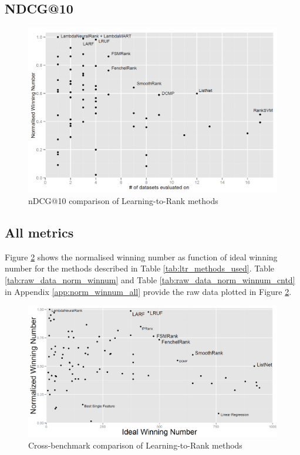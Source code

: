 \subsection{NDCG@10}
\begin{figure}[!h]
\includegraphics[scale=0.35]{gfx/ndcg10_winnum}
\caption{\acs{nDCG}@10 comparison of Learning-to-Rank methods}
\label{fig:normalised_winning_number_ndcg10}
\end{figure}


\subsection{All metrics}
Figure \ref{fig:normalised_winning_number_all} shows the normalised winning number as function of ideal winning number for the methods described in Table \ref{tab:ltr_methods_used}. Table \ref{tab:raw_data_norm_winnum} and Table \ref{tab:raw_data_norm_winnum_cntd} in Appendix \ref{app:norm_winnum_all} provide the raw data plotted in Figure \ref{fig:normalised_winning_number_all}.
\begin{figure}[!h]
\includegraphics[scale=0.35]{gfx/combined_normalized_winnum}
\caption{Cross-benchmark comparison of Learning-to-Rank methods}
\label{fig:normalised_winning_number_all}
\end{figure}

